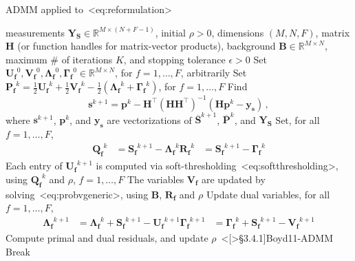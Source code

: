\documentclass[a4paper,11pt]{article}
\def\\{}%
\def\cite#1{<#1>}%
\def\eqref#1{<#1>}%
\begin{document}
\begin{algorithm}
  \caption{ADMM applied to~\eqref{eq:reformulation}}
  \label{alg:admm_applied}
  \begin{algorithmic}[1]
  \algrenewcommand{}
  \Require measurements $\bm{Y_S} \in \mathbb{R}^{M\times(N+F-1)}$, initial
  $\rho > 0$, dimensions $(M,N,F)$,  matrix $\bm{H}$ (or
  function handles for matrix-vector products), background $\bm{B} \in
  \mathbb{R}^{M\times N}$, maximum \# of iterations
  $K$, and stopping tolerance $\epsilon > 0$
  \algrenewcommand{}
  \Require  Set $\bm{U_f}^0, \bm{V_f}^0, \bm{\Lambda_f}^0, \bm{\Gamma_f}^0 \in
  \mathbb{R}^{M\times N}$, for $f =1, \ldots, F$, arbitrarily
    \State
    Set $\bm{P_f}^k = \frac{1}{2}\bm{U_f}^k + \frac{1}{2}\bm{V_f}^k -
    \frac{1}{2}(\bm{\Lambda_f}^k + \bm{\Gamma_f}^k)$, for $f = 1, \ldots, F$
    \State 
    Find
    $$\bm{s}^{k+1} = \bm{p}^k - \bm{H}^\top(\bm{H}\bm{H}^\top)^{-1}(\bm{H}
    \bm{p}^k - \bm{y_s})\,,$$
    where $\bm{s}^{k+1}$, $\bm{p}^k$, and $\bm{y_s}$ are vectorizations of
    $\overline{\bm{S}}^{k+1}$, $\overline{\bm{P}}^k$, and $\bm{Y_S}$
    \State
    Set, for all $f=1, \ldots, F$,
    \begin{align*}
      \bm{Q_f}^k &= \bm{S_f}^{k+1} - \bm{\Lambda_f}^k
      \\
      \bm{R_f}^k &= \bm{S_f}^{k+1} - \bm{\Gamma_f}^k
    \end{align*}
    \State
    Each entry of $\bm{U_f}^{k+1}$ is computed via
    soft-thresholding~\eqref{eq:softthresholding}, using $\bm{Q_f}^k$ and
    $\rho$, $f=1, \ldots, F$
    \State 
    The variables $\bm{V_f}$ are updated by solving~\eqref{eq:probvgeneric},
    using $\bm{B}$, $\bm{R_f}$ and $\rho$
    \State
    Update dual variables, for all $f=1, \ldots, F$,
    \begin{align*}
      \bm{\Lambda_f}^{k+1} &= \bm{\Lambda_f}^{k} + \bm{S_f}^{k+1} - \bm{U_f}^{k+1}
      \\
      \bm{\Gamma_f}^{k+1} &= \bm{\Gamma_f}^{k} + \bm{S_f}^{k+1} - \bm{V_f}^{k+1}
    \end{align*}
    \State Compute primal and dual residuals, and update
    $\rho$~\cite[\S3.4.1]{Boyd11-ADMM}
    \State Break
    \EndIf
  \EndFor
  \end{algorithmic}
\end{algorithm}

\printbibliography
\end{document}
